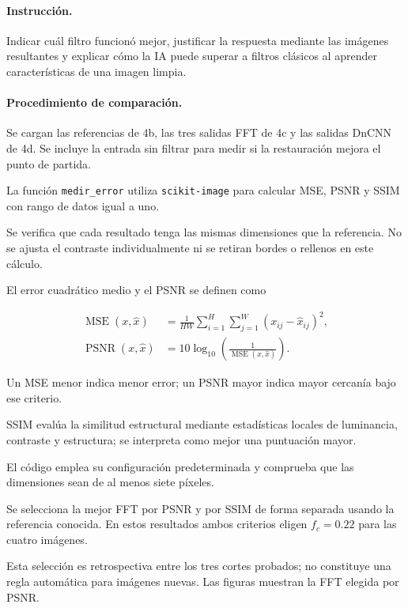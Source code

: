 \documentclass[11pt]{article}
\begin{document}
\paragraph{Instrucción.}

Indicar cuál filtro funcionó mejor, justificar la respuesta
mediante las imágenes resultantes y explicar cómo la IA
puede superar a filtros clásicos al aprender características
de una imagen limpia.

\paragraph{Procedimiento de comparación.}

Se cargan las referencias de 4b, las tres salidas FFT de 4c
y las salidas DnCNN de 4d. Se incluye la entrada sin filtrar
para medir si la restauración mejora el punto de partida.

La función \texttt{medir\_error} utiliza
\texttt{scikit-image} para calcular MSE, PSNR y SSIM
con rango de datos igual a uno.

Se verifica que cada resultado tenga las mismas dimensiones
que la referencia. No se ajusta el contraste individualmente
ni se retiran bordes o rellenos en este cálculo.

El error cuadrático medio y el PSNR se definen como

\begin{align}
 \operatorname{MSE}(x,\widehat{x})
 &=
 \frac{1}{HW}
 \sum_{i=1}^{H}
 \sum_{j=1}^{W}
 (x_{ij}-\widehat{x}_{ij})^2,
 \\
 \operatorname{PSNR}(x,\widehat{x})
 &=
 10\log_{10}\!
 \left(
    \frac{1}{\operatorname{MSE}(x,\widehat{x})}
 \right).
\end{align}

Un MSE menor indica menor error; un PSNR mayor indica mayor
cercanía bajo ese criterio.

SSIM evalúa la similitud estructural mediante estadísticas
locales de luminancia, contraste y estructura; se interpreta
como mejor una puntuación mayor.

El código emplea su configuración predeterminada y comprueba
que las dimensiones sean de al menos siete píxeles.

Se selecciona la mejor FFT por PSNR y por SSIM de forma
separada usando la referencia conocida. En estos resultados
ambos criterios eligen $f_c=0.22$ para las cuatro imágenes.

Esta selección es retrospectiva entre los tres cortes
probados; no constituye una regla automática para imágenes
nuevas. Las figuras muestran la FFT elegida por PSNR.
\end{document}
